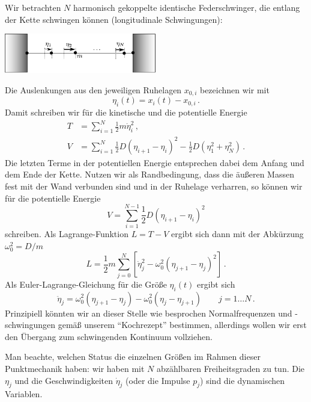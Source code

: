 \documentclass[paper=a4, fontsize=11.0pt, abstractoff, DIV12]{scrartcl}
\begin{document}
Wir betrachten $N$ harmonisch gekoppelte identische Federschwinger, die
entlang der Kette schwingen können (longitudinale Schwingungen):
\begin{center}
    \includegraphics[width=0.5\textwidth]{Kette.pdf}
\end{center}
Die Auslenkungen aus den jeweiligen Ruhelagen $x_{0,i}$ bezeichnen wir mit
\begin{equation}
\eta_i(t) = x_i(t) - x_{0,i}\,.
\end{equation}
Damit schreiben wir für die kinetische und die potentielle Energie
\begin{align}
T &= \sum\limits_{i=1}^{N} \frac{1}{2}m\dot{\eta}_{i}^2\,,\\
V &= \sum\limits_{i=1}^{N} \frac{1}{2}D\left(\eta_{i+1}-\eta_i\right)^2-\frac{1}{2}D\left(\eta_1^2+\eta_N^2\right)\,.
\end{align}
Die letzten Terme in der potentiellen Energie entsprechen dabei dem Anfang
und dem Ende der Kette. Nutzen wir als Randbedingung, dass die äußeren Massen
fest mit der Wand verbunden sind und in der Ruhelage verharren, so können wir
für die potentielle Energie
\begin{equation}
V = \sum\limits_{i=1}^{N-1} \frac{1}{2}D\left(\eta_{i+1}-\eta_i\right)^2
\end{equation}
schreiben. Als Lagrange-Funktion $L=T-V$ ergibt sich dann mit der Abkürzung
$\omega_0^2 = D/m$
\begin{equation}
L =\frac{1}{2}m\sum\limits_{j=0}^{N}\left[\dot{\eta}_j^2 -\omega_0^2(\eta_{j+1}-\eta_j)^2 \right]\,.
\end{equation}
Als Euler-Lagrange-Gleichung für die Größe $\eta_i(t)$ ergibt sich
\begin{equation}
\ddot{\eta}_j =\omega_0^2(\eta_{j+1}-\eta_j) - \omega_0^2(\eta_{j}-\eta_{j+1})\qquad j=1\dots N\,.
\label{eq:BewGl}
\end{equation}
Prinzipiell könnten wir an dieser Stelle wie besprochen Normalfrequenzen und
-schwingungen gemäß unserem ``Kochrezept'' bestimmen, allerdings wollen wir
erst den Übergang zum schwingenden Kontinuum vollziehen.

Man beachte, welchen Status die einzelnen Größen im Rahmen dieser
Punktmechanik haben: wir haben mit $N$ abzählbaren Freiheitsgraden zu tun.
Die $\eta_j$ und die Geschwindigkeiten $\dot\eta_j$ (oder die Impulse $p_j$)
sind die dynamischen Variablen.
\end{document}

